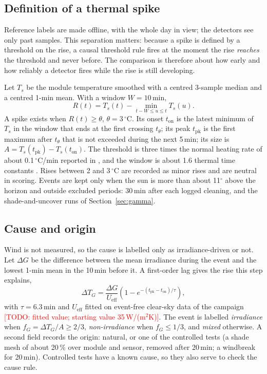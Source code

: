 \documentclass[conference]{IEEEtran}
\newcommand{\degC}{\ensuremath{^\circ}C}
\newcommand{\todo}[1]{\textcolor{red}{[TODO: #1]}}
\begin{document}
\subsection{Definition of a thermal spike}
Reference labels are made offline, with the whole day in view; the detectors see only
past samples. This separation matters: because a spike is defined by a threshold on the
rise, a causal threshold rule fires at the moment the rise \emph{reaches} the threshold
and never before. The comparison is therefore about how early and how reliably a
detector fires while the rise is still developing.

Let $T_s$ be the module temperature smoothed with a centred 3-sample median and a
centred 1-min mean. With a window $W=10$\,min,
\begin{equation}
R(t) = T_s(t) - \min_{t-W\le u\le t} T_s(u).
\end{equation}
A spike exists when $R(t)\ge\theta$, $\theta=3$\,\degC. Its onset $t_\mathrm{on}$ is the
latest minimum of $T_s$ in the window that ends at the first crossing $t_\theta$; its
peak $t_\mathrm{pk}$ is the first maximum after $t_\theta$ that is not exceeded during
the next 5\,min; its size is $A=T_s(t_\mathrm{pk})-T_s(t_\mathrm{on})$. The threshold is
three times the normal heating rate of about 0.1\,\degC/min reported in
\cite{moharram2013}, and the window is about 1.6 thermal time constants
\cite{herteleer2023}. Rises between 2 and 3\,\degC{} are recorded as minor rises and are
neutral in scoring. Events are kept only when the sun is more than about 11$^\circ$
above the horizon and outside excluded periods: 30\,min after each logged cleaning, and
the shade-and-uncover runs of Section~\ref{sec:gamma}.

\subsection{Cause and origin}
Wind is not measured, so the cause is labelled only as irradiance-driven or not. Let
$\Delta G$ be the difference between the mean irradiance during the event and the lowest
1-min mean in the 10\,min before it. A first-order lag gives the rise this step explains,
\begin{equation}
\Delta T_G = \frac{\Delta G}{U_\mathrm{eff}}
\left(1-e^{-(t_\mathrm{pk}-t_\mathrm{on})/\tau}\right),
\end{equation}
with $\tau=6.3$\,min \cite{herteleer2023} and $U_\mathrm{eff}$ fitted on event-free
clear-sky data of the campaign \todo{fitted value; starting value 35\,W/(m$^2$K)}. The
event is labelled \emph{irradiance} when $f_G=\Delta T_G/A\ge 2/3$,
\emph{non-irradiance} when $f_G\le 1/3$, and \emph{mixed} otherwise. A second field
records the origin: natural, or one of the controlled tests (a shade mesh of about 20\,\%
over module and sensor, removed after 20\,min; a windbreak for 20\,min). Controlled
tests have a known cause, so they also serve to check the cause rule.
\end{document}
